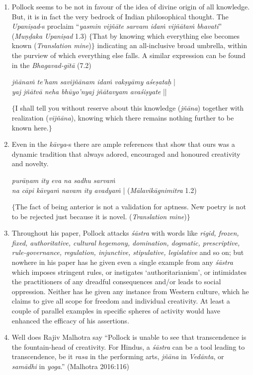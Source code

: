 \begin{enumerate}
\item Pollock seems to be not in favour of the idea of divine origin of all knowledge. But, it is in fact the very bedrock of Indian philosophical thought. The {\it Upaniṣad}-s proclaim ``\textit{yasmin vijñāte sarvam idaṁ vijñātaṁ bhavati}'' (\textit{Muṇḍaka Upaniṣad} 1.3) $\{$That by knowing which everything else becomes known (\textit{Translation mine})$\}$ indicating an all-inclusive broad umbrella, within the purview of which everything else falls. A similar expression can be found in the \textit{Bhagavad-gītā} (7.2)
\begin{myquote}
\textit{jñānaṁ te'ham savijñānam idaṁ vakṣyāmy aśeṣataḥ} |\\
\textit{yaj jñātvā neha bhūyo'nyaj jñātavyam avaśiṣyate} ||
\end{myquote}
$\{$I shall tell you without reserve about this knowledge ({\it jñāna}) together with realization ({\it vijñāna}), knowing which there remains nothing further to be known here.$\}$

\item Even in the {\it kāvya}-s there are ample references that show that ours was a dynamic tradition that always adored, encouraged and honoured creativity and novelty.
\begin{myquote}
\textit{purāṇam ity eva na sadhu sarvaṁ}\\
\textit{na cāpi kāvyaṁ navam ity avadyaṁ} | (\textit{Mālavikāgnimitra} 1.2)
\end{myquote}
$\{$The fact of being anterior is not a validation for aptness. New poetry is not to be rejected just because it is novel. (\textit{Translation mine})$\}$

\item Throughout his paper, Pollock attacks {\it śāstra} with words like \textit{rigid, frozen, fixed, authoritative, cultural hegemony, domination, dogmatic, prescriptive, rule-governance, regulation, injunctive, stipulative, legislative} and so on; but nowhere in his paper has he given even a single example from any {\it śāstra} which imposes stringent rules, or instigates `authoritarianism', or intimidates the practitioners of any dreadful consequences and/or leads to social oppression. Neither has he given any instance from Western culture, which he claims to give all scope for freedom and individual creativity. At least a couple of parallel examples in specific spheres of activity would have enhanced the efficacy of his assertions.

\item Well does Rajiv Malhotra say ``Pollock is unable to see that transcendence is the fountain-head of creativity. For Hindus, a {\it śāstra} can be a tool leading to transcendence, be it {\it rasa} in the performing arts, {\it jñāna} in {\it Vedānta}, or {\it samādhi} in {\it yoga}.'' (Malhotra 2016:116)


\end{enumerate}
